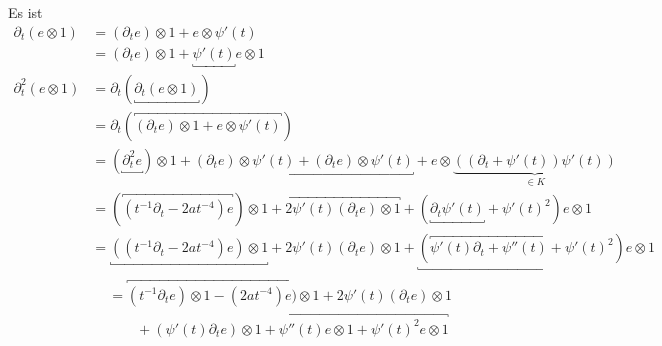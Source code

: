 \begin{comment}
\]
beziehungsweise gilt
\[
0 = \Big( t^4\partial_t^2 - (t^{3} + 4i\sqrt{2a}t^5) \partial_t
  + ( 2a - 8iat^6)\Big) e\otimes 1
\]
\begin{figure}[H]
\caption{Newton Polygon zu $\cN$}
\begin{center}
\fbox{
  \begin{tikzpicture}[scale=0.5,descr/.style={fill=white,inner sep=2.5pt}]
  \def\myPoints{0/0,0/6,1/2,1/4,2/2}
  \def\myPath{ -- node[descr]{$1$} (2,2)}
  \myPlotFunction{\myPoints}{\myPath}{2}{0}{6}{$N(\rho^*P_{\phi_1})$}
  \end{tikzpicture}
}
\end{center}
\end{figure}
\end{try}
\end{comment}
\begin{try} %
Es ist
\begin{align*}
\partial_t(e\otimes 1) &= (\partial_te)\otimes 1 + e\otimes \psi'(t) \\
  &= (\partial_te)\otimes 1 + \underbracket{\psi'(t)} e\otimes 1 \\
\partial_t^2(e\otimes 1) &= \partial_t(\underbracket{\partial_t(e\otimes 1)})\\
  &= \partial_t(\overbracket{(\partial_te)\otimes 1
    + e\otimes \psi'(t)})\\
  &= (\underbracket{\partial_t^2 e})\otimes 1
    + \underbracket{(\partial_t e)\otimes \psi'(t)
    +               (\partial_t e)\otimes \psi'(t)}
    + e\otimes\underset{\in K}{\underbrace{((\partial_t+\psi'(t))\psi'(t))}}\\
  &= (\overbracket{(t^{-1}\partial_t - 2at^{-4}) e})\otimes 1
    + \overbracket{2\psi'(t) (\partial_t e)\otimes 1}
    + (\underbracket{\partial_t\psi'(t)} + \psi'(t)^2)e\otimes 1\\
  &= \underbracket{((t^{-1}\partial_t - 2at^{-4}) e)\otimes 1}
    + 2\psi'(t) (\partial_t e)\otimes 1
    + \underbracket{(\overbracket{\psi'(t)\partial_t + \psi''(t)} +
    \psi'(t)^2)e\otimes 1}\\
  &\begin{aligned}
    &= \overbracket{
        (t^{-1}\partial_t e)\otimes 1
        - (2at^{-4}) e)\otimes 1
      }
      + 2\psi'(t) (\partial_t e)\otimes 1\\
    &\qquad + \overbracket{
        (\psi'(t)\partial_t e)\otimes 1
        + \psi''(t) e\otimes 1
        + \psi'(t)^2 e\otimes 1
      }\\
  \end{aligned} \\

\end{align*}
\end{try}
